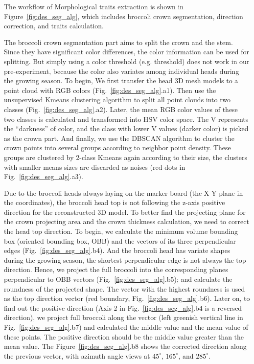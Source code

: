 The workflow of Morphological traits extraction is shown in Figure~\ref{fig:des_seg_alg}, which includes broccoli crown segmentation, direction correction, and traits calculation.



The broccoli crown segmentation part aims to split the crown and the stem. Since they have significant color differences, the color information can be used for splitting. But simply using a color threshold (e.g. \citet{otsu_threshold_1979} threshold) does not work in our pre-experiment, because the color also variates among individual heads during the growing season. To begin, We first transfer the head 3D mesh models to a point cloud with RGB colors (Fig.~\ref{fig:des_seg_alg}.a1). Then use the unsupervised Kmeans clustering algorithm to split all point clouds into two classes (Fig.~\ref{fig:des_seg_alg}.a2). Later, the mean RGB color values of these two classes is calculated and transformed into HSV color space. The V represents the ``darkness'' of color, and the class with lower V values (darker color) is picked as the crown part. And finally, we use the DBSCAN algorithm to cluster the crown points into several groups according to neighbor point density. These groups are clustered by 2-class Kmeans again according to their size, the clusters with smaller means sizes are discarded as noises (red dots in Fig.~\ref{fig:des_seg_alg}.a3).

Due to the broccoli heads always laying on the marker board (the X-Y plane in the coordinates), the broccoli head top is not following the z-axis positive direction for the reconstructed 3D model. To better find the projecting plane for the crown projecting area and the crown thickness calculation, we need to correct the head top direction. To begin, we calculate the minimum volume bounding box (oriented bounding box, OBB) and the vectors of its three perpendicular edges (Fig.~\ref{fig:des_seg_alg}.b4). And the broccoli head has variate shapes during the growing season, the shortest perpendicular edge is not always the top direction. Hence, we project the full broccoli into the corresponding planes perpendicular to OBB vectors (Fig.~\ref{fig:des_seg_alg}.b5); and calculate the roundness of the projected shape. The vector with the highest roundness is used as the top direction vector (red boundary, Fig.~\ref{fig:des_seg_alg}.b6). Later on, to find out the positive direction (Axis 2 in Fig.~\ref{fig:des_seg_alg}.b4 is a reversed direction), we project full broccoli along the vector (left greenish vertical line in Fig.~\ref{fig:des_seg_alg}.b7) and calculated the middle value and the mean value of these points. The positive direction should be the middle value greater than the mean value. The Figure~\ref{fig:des_seg_alg}.b8 shows the corrected direction along the previous vector, with azimuth angle views at $45^\circ$, $165^\circ$, and $285^\circ$.

